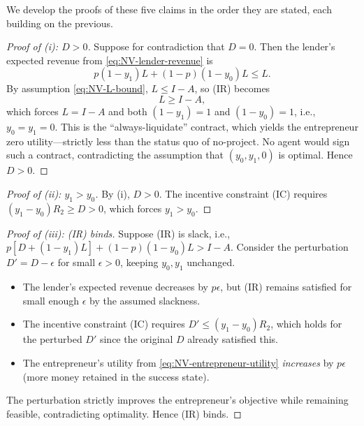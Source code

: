 \documentclass[11pt,a4paper,oneside]{book}
\def\leq{\leqslant}
\def\geq{\geqslant}
\theoremstyle{plain}
\theoremstyle{definition}
\theoremstyle{remark}
\numberwithin{equation}{chapter}
\begin{document}
We develop the proofs of these five claims in the order they are stated, each building on the previous.

\begin{proof}[Proof of (i): $D > 0$]
Suppose for contradiction that $D = 0$.
Then the lender's expected revenue from \eqref{eq:NV-lender-revenue} is
\begin{equation*}
  p(1 - y_1) L + (1 - p)(1 - y_0) L \leq L.
\end{equation*}
By assumption \eqref{eq:NV-L-bound}, $L \leq I - A$, so (IR) becomes
\begin{equation*}
  L \geq I - A,
\end{equation*}
which forces $L = I - A$ and both $(1 - y_1) = 1$ and $(1 - y_0) = 1$, i.e., $y_0 = y_1 = 0$.
This is the ``always-liquidate'' contract, which yields the entrepreneur zero utility---strictly less than the status quo of no-project.
No agent would sign such a contract, contradicting the assumption that $(y_0, y_1, 0)$ is optimal.
Hence $D > 0$.
\end{proof}

\begin{proof}[Proof of (ii): $y_1 > y_0$]
By (i), $D > 0$.
The incentive constraint (IC) requires $(y_1 - y_0) R_2 \geq D > 0$, which forces $y_1 > y_0$.
\end{proof}

\begin{proof}[Proof of (iii): (IR) binds]
Suppose (IR) is slack, i.e., $p[D + (1 - y_1) L] + (1 - p)(1 - y_0) L > I - A$.
Consider the perturbation $D' = D - \epsilon$ for small $\epsilon > 0$, keeping $y_0, y_1$ unchanged.
\begin{itemize}
  \item The lender's expected revenue decreases by $p \epsilon$, but (IR) remains satisfied for small enough $\epsilon$ by the assumed slackness.
  \item The incentive constraint (IC) requires $D' \leq (y_1 - y_0) R_2$, which holds for the perturbed $D'$ since the original $D$ already satisfied this.
  \item The entrepreneur's utility from \eqref{eq:NV-entrepreneur-utility} \emph{increases} by $p \epsilon$ (more money retained in the success state).
\end{itemize}
The perturbation strictly improves the entrepreneur's objective while remaining feasible, contradicting optimality.
Hence (IR) binds.
\end{proof}
\end{document}
